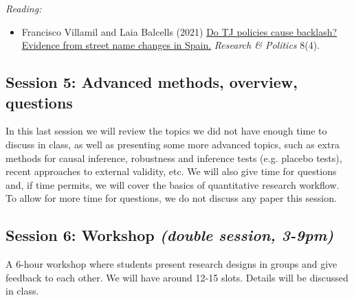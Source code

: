 \documentclass[12pt, a4paper]{article}
\begin{document}
\vspace{15pt}\noindent\textit{Reading:}

\begin{itemize}
  \item Francisco Villamil and Laia Balcells (2021) \href{https://doi.org/10.1177/20531680211058550}{Do TJ policies cause backlash? Evidence from street name changes in Spain.} \textit{Research \& Politics} 8(4).
\end{itemize}

\subsection*{Session 5: Advanced methods, overview, questions}

In this last session we will review the topics we did not have enough time to discuss in class, as well as presenting some more advanced topics, such as extra methods for causal inference, robustness and inference tests (e.g. placebo tests), recent approaches to external validity, etc. We will also give time for questions and, if time permits, we will cover the basics of quantitative research workflow. To allow for more time for questions, we do not discuss any paper this session.

\subsection*{Session 6: Workshop \textit{(double session, 3-9pm)}}

A 6-hour workshop where students present research designs in groups and give feedback to each other. We will have around 12-15 slots. Details will be discussed in class.
\end{document}
